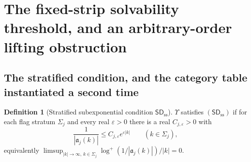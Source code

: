 \documentclass[11pt,letterpaper]{article}
\theoremstyle{definition}
\newtheorem{definition}[definition]{Definition}
\theoremstyle{remark}
\newcommand{\eps}{\varepsilon}
\newcommand{\sdss}{\mathsf{SD}_{\mathrm{ss}}}
\newcommand{\fla}{\mathfrak a}
\numberwithin{equation}{section}
\begin{document}
\section{The fixed-strip solvability threshold, and an arbitrary-order
lifting obstruction}
\label{dyn:sec:qplinear}

\subsection{The stratified condition, and the category table instantiated a
second time}
\label{dyn:subsec:qpss}

\begin{definition}[Stratified subexponential condition $\sdss$]
\label{dyn:def:qpss}
$\Upsilon$ satisfies $(\sdss)$ if for each flag stratum $\Sigma_j$ and
every real $\eps>0$ there is a real $C_{j,\eps}>0$ with
\begin{equation}\label{dyn:eq:qpss}
 \frac1{|\fla_j(k)|}\le C_{j,\eps}e^{\eps|k|}\qquad(k\in\Sigma_j),
\end{equation}
equivalently
$\limsup_{|k|\to\infty,\,k\in\Sigma_j}\log^{+}(1/|\fla_j(k)|)/|k|=0$.
\end{definition}
\end{document}
